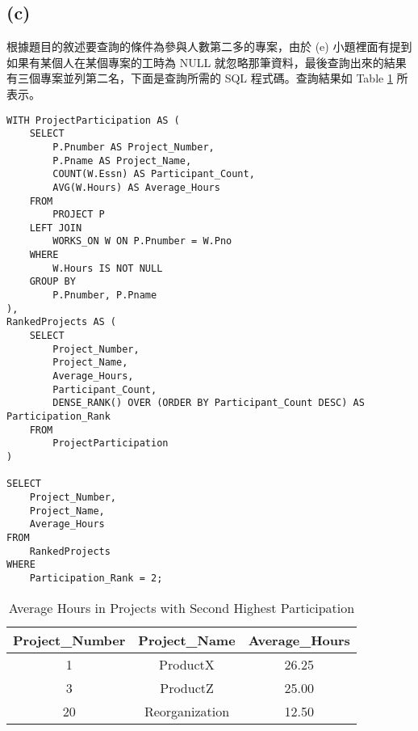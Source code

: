 \documentclass{article}
\begin{document}
\subsection*{(c)}
根據題目的敘述要查詢的條件為參與人數第二多的專案，由於 (e) 小題裡面有提到如果有某個人在某個專案的工時為 NULL 就忽略那筆資料，最後查詢出來的結果有三個專案並列第二名，下面是查詢所需的 SQL 程式碼。查詢結果如 Table \ref{table:1_c} 所表示。
\begin{verbatim}
WITH ProjectParticipation AS (
    SELECT 
        P.Pnumber AS Project_Number,
        P.Pname AS Project_Name,
        COUNT(W.Essn) AS Participant_Count,  
        AVG(W.Hours) AS Average_Hours         
    FROM 
        PROJECT P
    LEFT JOIN 
        WORKS_ON W ON P.Pnumber = W.Pno
    WHERE 
        W.Hours IS NOT NULL  
    GROUP BY 
        P.Pnumber, P.Pname
),
RankedProjects AS (
    SELECT 
        Project_Number,
        Project_Name,
        Average_Hours,
        Participant_Count,
        DENSE_RANK() OVER (ORDER BY Participant_Count DESC) AS Participation_Rank  
    FROM 
        ProjectParticipation
)

SELECT 
    Project_Number,
    Project_Name,
    Average_Hours
FROM 
    RankedProjects
WHERE 
    Participation_Rank = 2; 
\end{verbatim}
\begin{table}[H]
\centering
\begin{tabular}{ccc}
\toprule
Project\_Number & Project\_Name & Average\_Hours \\
\midrule
1 & ProductX & 26.25 \\
3 & ProductZ & 25.00 \\
20 & Reorganization & 12.50 \\
\bottomrule
\end{tabular}
\caption{Average Hours in Projects with Second Highest Participation}
\label{table:1_c}
\end{table}
\end{document}
